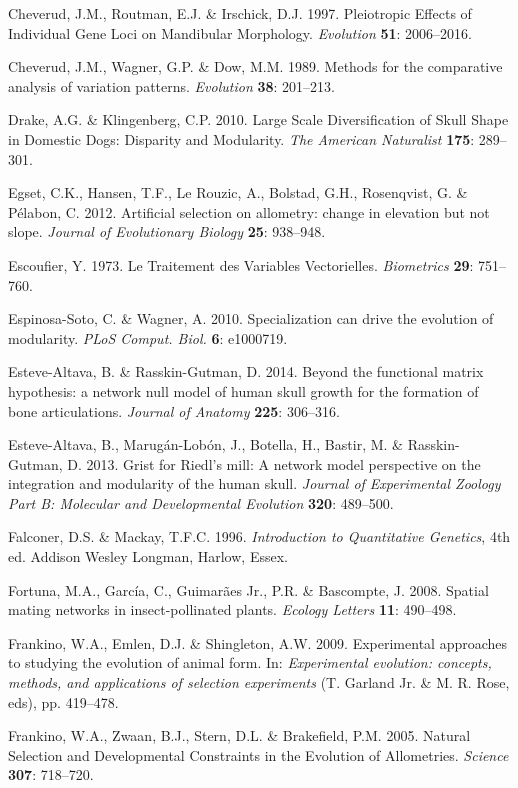 \documentclass[12pt,twoside]{report}
\begin{document}
Cheverud, J.M., Routman, E.J. \& Irschick, D.J. 1997. Pleiotropic
Effects of Individual Gene Loci on Mandibular Morphology.
\emph{Evolution} \textbf{51}: 2006--2016.

Cheverud, J.M., Wagner, G.P. \& Dow, M.M. 1989. Methods for the
comparative analysis of variation patterns. \emph{Evolution}
\textbf{38}: 201--213.

Drake, A.G. \& Klingenberg, C.P. 2010. Large Scale Diversification of
Skull Shape in Domestic Dogs: Disparity and Modularity. \emph{The
American Naturalist} \textbf{175}: 289--301.

Egset, C.K., Hansen, T.F., Le Rouzic, A., Bolstad, G.H., Rosenqvist, G.
\& Pélabon, C. 2012. Artificial selection on allometry: change in
elevation but not slope. \emph{Journal of Evolutionary Biology}
\textbf{25}: 938--948.

Escoufier, Y. 1973. Le Traitement des Variables Vectorielles.
\emph{Biometrics} \textbf{29}: 751--760.

Espinosa-Soto, C. \& Wagner, A. 2010. Specialization can drive the
evolution of modularity. \emph{PLoS Comput. Biol.} \textbf{6}: e1000719.

Esteve-Altava, B. \& Rasskin-Gutman, D. 2014. Beyond the functional
matrix hypothesis: a network null model of human skull growth for the
formation of bone articulations. \emph{Journal of Anatomy} \textbf{225}:
306--316.

Esteve-Altava, B., Marugán-Lobón, J., Botella, H., Bastir, M. \&
Rasskin-Gutman, D. 2013. Grist for Riedl's mill: A network model
perspective on the integration and modularity of the human skull.
\emph{Journal of Experimental Zoology Part B: Molecular and
Developmental Evolution} \textbf{320}: 489--500.

Falconer, D.S. \& Mackay, T.F.C. 1996. \emph{Introduction to
Quantitative Genetics}, 4th ed. Addison Wesley Longman, Harlow, Essex.

Fortuna, M.A., García, C., Guimarães Jr., P.R. \& Bascompte, J. 2008.
Spatial mating networks in insect-pollinated plants. \emph{Ecology
Letters} \textbf{11}: 490--498.

Frankino, W.A., Emlen, D.J. \& Shingleton, A.W. 2009. Experimental
approaches to studying the evolution of animal form. In:
\emph{Experimental evolution: concepts, methods, and applications of
selection experiments} (T. Garland Jr. \& M. R. Rose, eds), pp.
419--478.

Frankino, W.A., Zwaan, B.J., Stern, D.L. \& Brakefield, P.M. 2005.
Natural Selection and Developmental Constraints in the Evolution of
Allometries. \emph{Science} \textbf{307}: 718--720.
\end{document}
